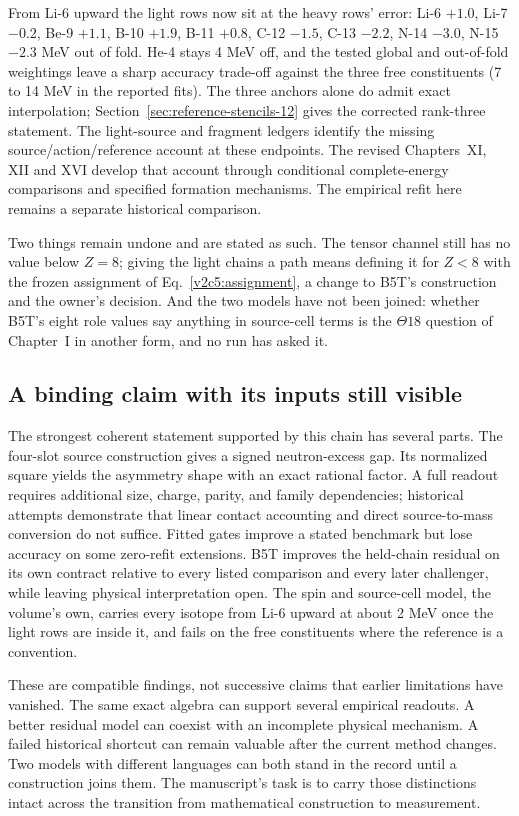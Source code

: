 From Li-6 upward the light rows now sit at the heavy rows' error: Li-6 $+1.0$, Li-7 $-0.2$, Be-9 $+1.1$, B-10 $+1.9$, B-11 $+0.8$, C-12 $-1.5$, C-13 $-2.2$, N-14 $-3.0$, N-15 $-2.3$ MeV out of fold. He-4 stays 4 MeV off, and the tested global and out-of-fold weightings leave a sharp accuracy trade-off against the three free constituents (7 to 14 MeV in the reported fits). The three anchors alone do admit exact interpolation; Section~\ref{sec:reference-stencils-12} gives the corrected rank-three statement. The light-source and fragment ledgers identify the missing source/action/reference account at these endpoints. The revised Chapters~XI, XII and XVI develop that account through conditional complete-energy comparisons and specified formation mechanisms. The empirical refit here remains a separate historical comparison.

Two things remain undone and are stated as such. The tensor channel still has no value below $Z=8$; giving the light chains a path means defining it for $Z<8$ with the frozen assignment of Eq.~\eqref{v2c5:assignment}, a change to B5T's construction and the owner's decision. And the two models have not been joined: whether B5T's eight role values say anything in source-cell terms is the $\Theta18$ question of Chapter~I in another form, and no run has asked it.

\subsection{A binding claim with its inputs still visible}
\label{v2c5:conclusion}

The strongest coherent statement supported by this chain has several parts. The four-slot source construction gives a signed neutron-excess gap. Its normalized square yields the asymmetry shape with an exact rational factor. A full readout requires additional size, charge, parity, and family dependencies; historical attempts demonstrate that linear contact accounting and direct source-to-mass conversion do not suffice. Fitted gates improve a stated benchmark but lose accuracy on some zero-refit extensions. B5T improves the held-chain residual on its own contract relative to every listed comparison and every later challenger, while leaving physical interpretation open. The spin and source-cell model, the volume's own, carries every isotope from Li-6 upward at about 2 MeV once the light rows are inside it, and fails on the free constituents where the reference is a convention.

These are compatible findings, not successive claims that earlier limitations have vanished. The same exact algebra can support several empirical readouts. A better residual model can coexist with an incomplete physical mechanism. A failed historical shortcut can remain valuable after the current method changes. Two models with different languages can both stand in the record until a construction joins them. The manuscript's task is to carry those distinctions intact across the transition from mathematical construction to measurement.

